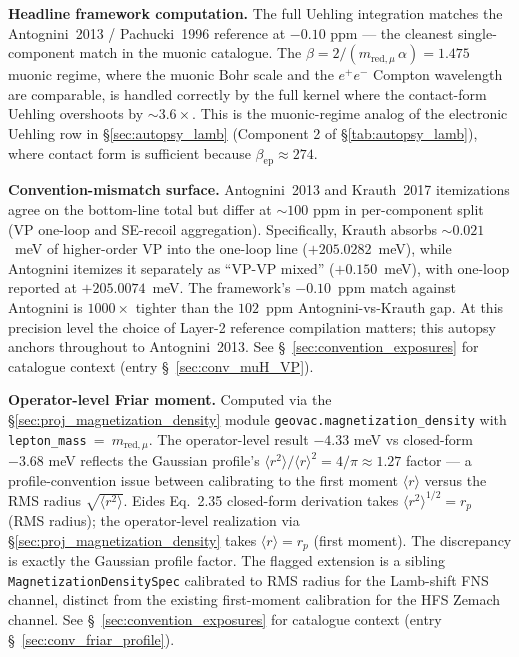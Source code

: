 \documentclass[11pt]{article}
\begin{document}
\textbf{Headline framework computation.}  The full Uehling integration
matches the Antognini~2013 / Pachucki~1996 reference at $-0.10$ ppm
--- the cleanest single-component match in the muonic catalogue.
The $\beta = 2/(m_{\text{red},\mu}\,\alpha) = 1.475$ muonic regime,
where the muonic Bohr scale and the $e^+ e^-$ Compton wavelength are
comparable, is handled correctly by the full kernel where the
contact-form Uehling overshoots by $\sim 3.6\times$.  This is the
muonic-regime analog of the electronic Uehling row in
\S\ref{sec:autopsy_lamb} (Component 2 of \S\ref{tab:autopsy_lamb}),
where contact form is sufficient because $\beta_\text{ep} \approx 274$.

\textbf{Convention-mismatch surface.}  Antognini~2013 and Krauth~2017
itemizations agree on the bottom-line total but differ at $\sim 100$
ppm in per-component split (VP one-loop and SE-recoil aggregation).
Specifically, Krauth absorbs $\sim 0.021$~meV of higher-order VP into the
one-loop line ($+205.0282$~meV), while Antognini itemizes it separately
as ``VP-VP mixed'' ($+0.150$~meV), with one-loop reported at
$+205.0074$~meV.  The framework's $-0.10$~ppm match against Antognini
is $1000\times$ tighter than the $102$~ppm Antognini-vs-Krauth gap.
At this precision level the choice of Layer-2 reference compilation
matters; this autopsy anchors throughout to Antognini~2013.  See
\S~\ref{sec:convention_exposures} for catalogue context (entry
\S~\ref{sec:conv_muH_VP}).

\textbf{Operator-level Friar moment.}  Computed via the
\S\ref{sec:proj_magnetization_density} module
\texttt{geovac.magnetization\_density} with
\texttt{lepton\_mass}~=~$m_{\text{red},\mu}$.  The operator-level
result $-4.33$ meV vs closed-form $-3.68$ meV reflects the Gaussian
profile's $\langle r^2\rangle / \langle r\rangle^2 = 4/\pi \approx
1.27$ factor --- a profile-convention issue between calibrating to
the first moment $\langle r\rangle$ versus the RMS radius
$\sqrt{\langle r^2\rangle}$.  Eides Eq.~2.35 closed-form derivation
takes $\langle r^2\rangle^{1/2} = r_p$ (RMS radius); the operator-level
realization via \S\ref{sec:proj_magnetization_density} takes
$\langle r\rangle = r_p$ (first moment).  The discrepancy is exactly
the Gaussian profile factor.  The flagged extension is a sibling
\texttt{MagnetizationDensitySpec} calibrated to RMS radius for the
Lamb-shift FNS channel, distinct from the existing first-moment
calibration for the HFS Zemach channel.  See
\S~\ref{sec:convention_exposures} for catalogue context (entry
\S~\ref{sec:conv_friar_profile}).
\end{document}
